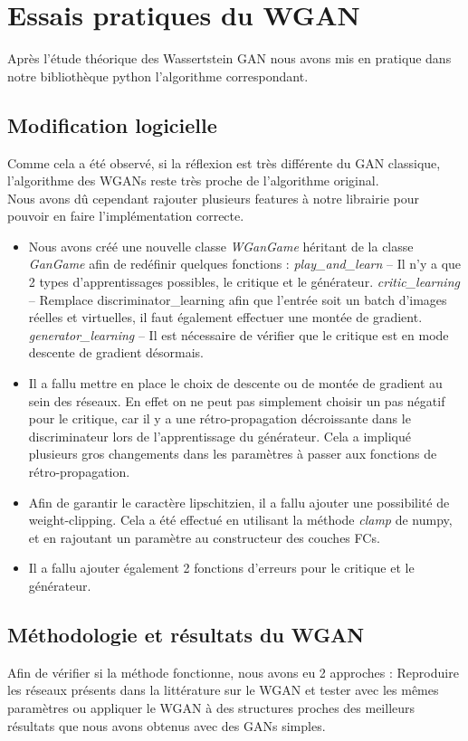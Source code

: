  \section{Essais pratiques du WGAN}
 	Après l'étude théorique des Wassertstein GAN nous avons mis en pratique dans notre bibliothèque python l'algorithme correspondant.

 \subsection{Modification logicielle}
 	Comme cela a été observé, si la réflexion est très différente du GAN classique, l'algorithme des WGANs reste très proche de l'algorithme original. \\
 	Nous avons dû cependant rajouter plusieurs features à notre librairie pour pouvoir en faire l'implémentation correcte.

 	\begin{itemize}
 		\item Nous avons créé une nouvelle classe \emph{WGanGame} héritant de la classe \emph{GanGame} afin de redéfinir quelques fonctions :
 			\subitem \emph{play\_and\_learn} -- Il n'y a que 2 types d'apprentissages possibles, le critique et le générateur.
 			\subitem \emph{critic\_learning} -- Remplace discriminator\_learning afin que l'entrée soit un batch d'images réelles et virtuelles, il faut également effectuer une montée de gradient.
 			\subitem \emph{generator\_learning}  -- Il est nécessaire de vérifier que le critique est en mode descente de gradient désormais.
 		\item Il a fallu mettre en place le choix de descente ou de montée de gradient au sein des réseaux.
 		En effet on ne peut pas simplement choisir un pas négatif pour le critique, car il y a une rétro-propagation décroissante dans le discriminateur lors de l'apprentissage du générateur. Cela a impliqué plusieurs gros changements dans les paramètres à passer aux fonctions de rétro-propagation.
 		\item Afin de garantir le caractère lipschitzien, il a fallu ajouter une possibilité de weight-clipping. Cela a été effectué en utilisant la méthode \emph{clamp} de numpy, et en rajoutant un paramètre au constructeur des couches FCs.
 		\item Il a fallu ajouter également 2 fonctions d'erreurs pour le critique et le générateur.

 	\end{itemize}
 \subsection{Méthodologie et résultats du WGAN}
 	Afin de vérifier si la méthode fonctionne, nous avons eu 2 approches : Reproduire les réseaux présents dans la littérature sur le WGAN et tester avec les mêmes paramètres ou appliquer le WGAN à des structures proches des meilleurs résultats que nous avons obtenus avec des GANs simples. 

